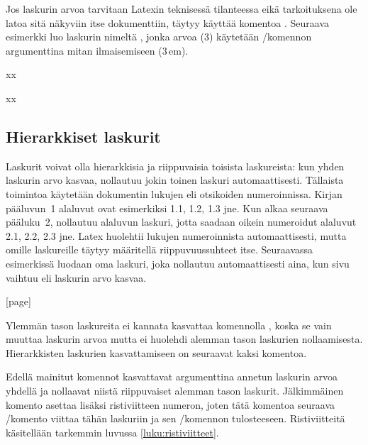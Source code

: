 Jos laskurin arvoa tarvitaan Latexin teknisessä tilanteessa eikä
tarkoituksena ole latoa sitä näkyviin itse dokumenttiin, täytyy käyttää
komentoa . Seuraava esimerkki luo laskurin nimeltä
, jonka arvoa (3) käytetään \-/komennon
argumenttina mitan ilmaisemiseen (3\,em).

\pagebreak[3]

\begin{koodilohkosis}
  \setcounter{mitta}{3}
  xx
\end{koodilohkosis}

\begin{tulossis}
  x\hspace{3em}x
\end{tulossis}

\subsection{Hierarkkiset laskurit}

Laskurit voivat olla hierarkkisia ja riippuvaisia toisista laskureista:
kun yhden laskurin arvo kasvaa, nollautuu jokin toinen laskuri
automaattisesti. Tällaista toimintoa käytetään dokumentin lukujen eli
otsikoiden numeroinnissa. Kirjan pääluvun~1 alaluvut ovat esimerkiksi
1.1, 1.2, 1.3 jne. Kun alkaa seuraava pääluku~2, nollautuu alaluvun
laskuri, jotta saadaan oikein numeroidut alaluvut 2.1, 2.2, 2.3 jne.
Latex huolehtii lukujen numeroinnista automaattisesti, mutta omille
laskureille täytyy määritellä riippuvuussuhteet itse. Seuraavassa
esimerkissä luodaan oma laskuri, joka nollautuu automaattisesti aina,
kun sivu vaihtuu eli laskurin  arvo kasvaa.

\begin{koodilohkosis}
  [page]
\end{koodilohkosis}

Ylemmän tason laskureita ei kannata kasvattaa komennolla , koska se vain muuttaa laskurin arvoa mutta ei
huolehdi alemman tason laskurien nollaamisesta. Hierarkkisten laskurien
kasvattamiseen on seuraavat kaksi komentoa.

\begin{koodilohkosis}
\end{koodilohkosis}

Edellä mainitut komennot kasvattavat argumenttina annetun laskurin arvoa
yhdellä ja nollaavat niistä riippuvaiset alemman tason laskurit.
Jälkimmäinen komento  asettaa lisäksi
ristiviitteen numeron, joten tätä komentoa seuraava \-/komento viittaa tähän laskuriin ja sen \-/komennon tulosteeseen. Ristiviitteitä käsitellään
tarkemmin luvussa \ref{luku:ristiviitteet}.

